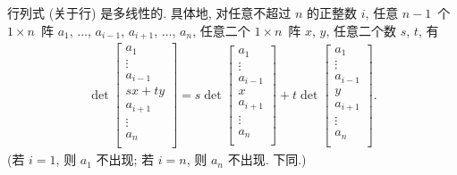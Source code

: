 \documentclass[%
    UTF8,%
    fontset=none,%
    punct=kaiming,%
    zihao=-4,%
    a4paper,%
    oneside,%
]{ctexbook}
\begin{document}
\begin{theorem}
    行列式 (关于行) 是多线性的.
    具体地, 对任意不超过 \(n\) 的正整数 \(i\),
    任意 \(n-1\)~个 \(1 \times n\)~阵
    \(a_1\), \(\dots\), \(a_{i-1}\),
    \(a_{i+1}\), \(\dots\), \(a_n\),
    任意二个 \(1 \times n\)~阵 \(x\), \(y\),
    任意二个数 \(s\), \(t\),
    有
    \begin{align*}
        \det
        {\begin{bmatrix}
                 a_1     \\
                 \vdots  \\
                 a_{i-1} \\
                 sx + ty \\
                 a_{i+1} \\
                 \vdots  \\
                 a_{n}   \\
             \end{bmatrix}}
        =
        s
        \det
        {\begin{bmatrix}
                 a_1     \\
                 \vdots  \\
                 a_{i-1} \\
                 x       \\
                 a_{i+1} \\
                 \vdots  \\
                 a_{n}   \\
             \end{bmatrix}}
        +
        t
        \det
        {\begin{bmatrix}
                 a_1     \\
                 \vdots  \\
                 a_{i-1} \\
                 y       \\
                 a_{i+1} \\
                 \vdots  \\
                 a_{n}   \\
             \end{bmatrix}}.
    \end{align*}
    (若 \(i = 1\), 则 \(a_1\) 不出现;
    若 \(i = n\), 则 \(a_n\) 不出现.
    下同.)
\end{theorem}
\end{document}
